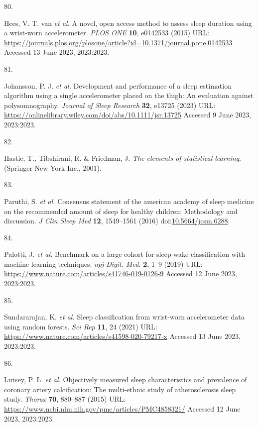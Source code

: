 \documentclass[
  10pt,
]{scrbook}
\newlength{\cslhangindent}
\newlength{\csllabelwidth}
\newlength{\cslentryspacingunit} %
\newenvironment{CSLReferences}[2] %
 {%
  \setlength{\parindent}{0pt}
  \ifodd #1
  \let\oldpar\par
  \def\par{\hangindent=\cslhangindent\oldpar}
  \fi
  \setlength{\parskip}{#2\cslentryspacingunit}
 }%
 {}
\newcommand{\CSLLeftMargin}[1]{\parbox[t]{\csllabelwidth}{#1}}
\newcommand{\CSLRightInline}[1]{\parbox[t]{\linewidth - \csllabelwidth}{#1}\break}
\begin{document}
\begin{CSLReferences}{0}{0}
\leavevmode{}%
\CSLLeftMargin{80. }%
\CSLRightInline{Hees, V. T. van \emph{et al.} A novel, open access
method to assess sleep duration using a wrist-worn accelerometer.
\emph{{PLOS} {ONE}} \textbf{10}, e0142533 (2015) URL:
\url{https://journals.plos.org/plosone/article?id=10.1371/journal.pone.0142533}
Accessed 13 June 2023, 2023:2023.}

\leavevmode{}%
\CSLLeftMargin{81. }%
\CSLRightInline{Johansson, P. J. \emph{et al.} Development and
performance of a sleep estimation algorithm using a single accelerometer
placed on the thigh: An evaluation against polysomnography.
\emph{Journal of Sleep Research} \textbf{32}, e13725 (2023) URL:
\url{https://onlinelibrary.wiley.com/doi/abs/10.1111/jsr.13725} Accessed
9 June 2023, 2023:2023.}

\leavevmode{}%
\CSLLeftMargin{82. }%
\CSLRightInline{Hastie, T., Tibshirani, R. \& Friedman, J. \emph{The
elements of statistical learning}. (Springer New York Inc., 2001).}

\leavevmode{}%
\CSLLeftMargin{83. }%
\CSLRightInline{Paruthi, S. \emph{et al.} Consensus statement of the
american academy of sleep medicine on the recommended amount of sleep
for healthy children: Methodology and discussion. \emph{J Clin Sleep
Med} \textbf{12}, 1549--1561 (2016)
doi:\href{https://doi.org/10.5664/jcsm.6288}{10.5664/jcsm.6288}.}

\leavevmode{}%
\CSLLeftMargin{84. }%
\CSLRightInline{Palotti, J. \emph{et al.} Benchmark on a large cohort
for sleep-wake classification with machine learning techniques.
\emph{npj Digit. Med.} \textbf{2}, 1--9 (2019) URL:
\url{https://www.nature.com/articles/s41746-019-0126-9} Accessed 12 June
2023, 2023:2023.}

\leavevmode{}%
\CSLLeftMargin{85. }%
\CSLRightInline{Sundararajan, K. \emph{et al.} Sleep classification from
wrist-worn accelerometer data using random forests. \emph{Sci Rep}
\textbf{11}, 24 (2021) URL:
\url{https://www.nature.com/articles/s41598-020-79217-x} Accessed 13
June 2023, 2023:2023.}

\leavevmode{}%
\CSLLeftMargin{86. }%
\CSLRightInline{Lutsey, P. L. \emph{et al.} Objectively measured sleep
characteristics and prevalence of coronary artery calcification: The
multi-ethnic study of atherosclerosis sleep study. \emph{Thorax}
\textbf{70}, 880--887 (2015) URL:
\url{https://www.ncbi.nlm.nih.gov/pmc/articles/PMC4858321/} Accessed 12
June 2023, 2023:2023.}


\end{CSLReferences}
\end{document}
